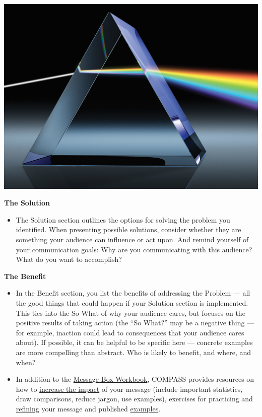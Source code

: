 \documentclass[
]{book}
\providecommand{\tightlist}{%
  \setlength{\itemsep}{0pt}\setlength{\parskip}{0pt}}
\begin{document}
\includegraphics{images/m4s1_prism.jpeg}

\textbf{The Solution}

\begin{itemize}
\tightlist
\item
  The Solution section outlines the options for solving the problem you identified. When presenting possible solutions, consider whether they are something your audience can influence or act upon. And remind yourself of your communication goals: Why are you communicating with this audience? What do you want to accomplish?
\end{itemize}

\textbf{The Benefit}

\begin{itemize}
\item
  In the Benefit section, you list the benefits of addressing the Problem --- all the good things that could happen if your Solution section is implemented. This ties into the So What of why your audience cares, but focuses on the positive results of taking action (the ``So What?'' may be a negative thing --- for example, inaction could lead to consequences that your audience cares about). If possible, it can be helpful to be specific here --- concrete examples are more compelling than abstract. Who is likely to benefit, and where, and when?
\item
  In addition to the \href{https://www.compassscicomm.org/wp-content/uploads/2020/05/The-Message-Box-Workbook.pdf}{Message Box Workbook}, COMPASS provides resources on how to \href{https://www.compassscicomm.org/practice/}{increase the impact} of your message (include important statistics, draw comparisons, reduce jargon, use examples), exercises for practicing and \href{https://www.compassscicomm.org/compare/}{refining} your message and published \href{https://www.compassscicomm.org/examples/}{examples}.
\end{itemize}
\end{document}
